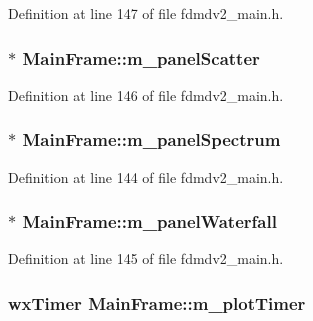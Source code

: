 Definition at line 147 of file fdmdv2\-\_\-main.\-h.

\hypertarget{class_main_frame_ada5dd6fc66036782c19f12175793da13}{
\subsubsection[{m\-\_\-panel\-Scatter}]{$\ast$ Main\-Frame\-::m\-\_\-panel\-Scatter}}\label{class_main_frame_ada5dd6fc66036782c19f12175793da13}


Definition at line 146 of file fdmdv2\-\_\-main.\-h.

\hypertarget{class_main_frame_a3fc0fe9ca321814476397cb32476e40c}{
\subsubsection[{m\-\_\-panel\-Spectrum}]{$\ast$ Main\-Frame\-::m\-\_\-panel\-Spectrum}}\label{class_main_frame_a3fc0fe9ca321814476397cb32476e40c}


Definition at line 144 of file fdmdv2\-\_\-main.\-h.

\hypertarget{class_main_frame_a6f0fa80dd24e33f0d32228ac73418882}{
\subsubsection[{m\-\_\-panel\-Waterfall}]{$\ast$ Main\-Frame\-::m\-\_\-panel\-Waterfall}}\label{class_main_frame_a6f0fa80dd24e33f0d32228ac73418882}


Definition at line 145 of file fdmdv2\-\_\-main.\-h.

\hypertarget{class_main_frame_aabe58bef730ca69b342f8ac663c3d70d}{
\subsubsection[{m\-\_\-plot\-Timer}]{\setlength{\rightskip}{0pt plus 5cm}wx\-Timer Main\-Frame\-::m\-\_\-plot\-Timer}}\label{class_main_frame_aabe58bef730ca69b342f8ac663c3d70d}


